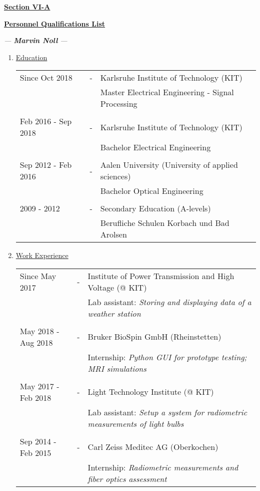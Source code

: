 \documentclass[12pt,a4paper]{scrartcl}
\begin{document}
	

\begin{center}
	\Large\textbf{\underline{Section VI-A}}
	
	\vspace{0.5cm}
	
	\Large\textbf{\underline{Personnel Qualifications List}}
	
	\large \textit{--- \textbf{Marvin Noll} ---}
\end{center}


\begin{enumerate}[label=\Alph*.]
	\item \underline{Education}
	
		\begin{tabulary}{\textwidth}{@{}p{3.8cm} C L}
			Since Oct 2018 & - & Karlsruhe Institute of Technology (KIT) \\
			& & Master Electrical Engineering - Signal Processing \\
			\\[-0.5em]
			Feb 2016 - Sep 2018 & - & Karlsruhe Institute of Technology (KIT) \\
			& & Bachelor Electrical Engineering \\
			\\[-0.5em]
			Sep 2012 - Feb 2016 & - & Aalen University (University of applied sciences) \\
			& & Bachelor Optical Engineering \\
			\\[-0.5em]
			2009 - 2012 & - & Secondary Education (A-levels) \\
			& & Berufliche Schulen Korbach und Bad Arolsen \\
		\end{tabulary}
	
	\item \underline{Work Experience}
		
		\begin{tabulary}{\textwidth}{@{}p{3.8cm}CL}
			Since May 2017 & - & Institute of Power Transmission and High Voltage (@ KIT) \\
			& & Lab assistant: \textit{Storing and displaying data of a weather station}\\
			\\[-0.5em]
			May 2018 - Aug 2018 & - & Bruker BioSpin GmbH (Rheinstetten) \\
			& & Internship: \textit{Python GUI for prototype testing; MRI simulations}  \\
			\\[-0.5em]
			May 2017 - Feb 2018 & - & Light Technology Institute (@ KIT) \\
			& & Lab assistant: \textit{Setup a system for radiometric measurements of light bulbs}  \\
			\\[-0.5em]
			Sep 2014 - Feb 2015 & - & Carl Zeiss Meditec AG (Oberkochen) \\
			& & Internship: \textit{Radiometric measurements and fiber optics assessment}  \\
		\end{tabulary}
	

\end{enumerate}
\end{document}
